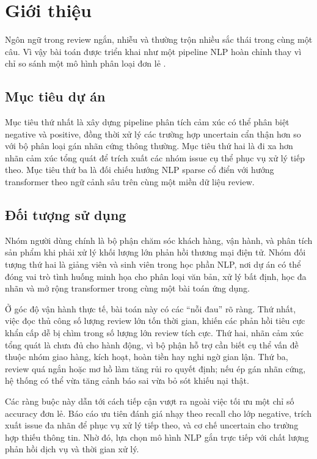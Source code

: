 ﻿\documentclass[12pt,a4paper]{article}
\begin{document}
\tableofcontents
\newpage
{}

\section{Giới thiệu}
Ngôn ngữ trong review ngắn, nhiễu và thường trộn nhiều sắc thái trong cùng một câu. Vì vậy bài toán được triển khai như một pipeline NLP hoàn chỉnh thay vì chỉ so sánh một mô hình phân loại đơn lẻ \cite{jurafsky2026,turney2002}.

\subsection{Mục tiêu dự án}
Mục tiêu thứ nhất là xây dựng pipeline phân tích cảm xúc có thể phân biệt negative và positive, đồng thời xử lý các trường hợp uncertain cẩn thận hơn so với bộ phân loại gán nhãn cứng thông thường. Mục tiêu thứ hai là đi xa hơn nhãn cảm xúc tổng quát để trích xuất các nhóm issue cụ thể phục vụ xử lý tiếp theo. Mục tiêu thứ ba là đối chiếu hướng NLP sparse cổ điển với hướng transformer theo ngữ cảnh sâu trên cùng một miền dữ liệu review.

\subsection{Đối tượng sử dụng}
Nhóm người dùng chính là bộ phận chăm sóc khách hàng, vận hành, và phân tích sản phẩm khi phải xử lý khối lượng lớn phản hồi thương mại điện tử. Nhóm đối tượng thứ hai là giảng viên và sinh viên trong học phần NLP, nơi dự án có thể đóng vai trò tình huống minh họa cho phân loại văn bản, xử lý bất định, học đa nhãn và mở rộng transformer trong cùng một bài toán ứng dụng.

Ở góc độ vận hành thực tế, bài toán này có các ``nỗi đau'' rõ ràng. Thứ nhất, việc đọc thủ công số lượng review lớn tốn thời gian, khiến các phản hồi tiêu cực khẩn cấp dễ bị chìm trong số lượng lớn review tích cực. Thứ hai, nhãn cảm xúc tổng quát là chưa đủ cho hành động, vì bộ phận hỗ trợ cần biết cụ thể vấn đề thuộc nhóm giao hàng, kích hoạt, hoàn tiền hay nghi ngờ gian lận. Thứ ba, review quá ngắn hoặc mơ hồ làm tăng rủi ro quyết định; nếu ép gán nhãn cứng, hệ thống có thể vừa tăng cảnh báo sai vừa bỏ sót khiếu nại thật.

Các ràng buộc này dẫn tới cách tiếp cận vượt ra ngoài việc tối ưu một chỉ số accuracy đơn lẻ. Báo cáo ưu tiên đánh giá nhạy theo recall cho lớp negative, trích xuất issue đa nhãn để phục vụ xử lý tiếp theo, và cơ chế uncertain cho trường hợp thiếu thông tin. Nhờ đó, lựa chọn mô hình NLP gắn trực tiếp với chất lượng phản hồi dịch vụ và thời gian xử lý.
\end{document}
